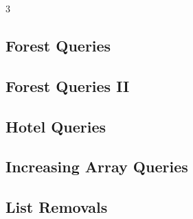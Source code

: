 \documentclass[8pt]{extarticle}
\begin{document}
\begin{multicols*}{3}
\subsection{Forest Queries}
\begin{caixaenunciado}

\end{caixaenunciado}
\vspace{0.3cm}


\subsection{Forest Queries II}
\begin{caixaenunciado}

\end{caixaenunciado}
\vspace{0.3cm}


\subsection{Hotel Queries}
\begin{caixaenunciado}

\end{caixaenunciado}
\vspace{0.3cm}


\subsection{Increasing Array Queries}
\begin{caixaenunciado}

\end{caixaenunciado}
\vspace{0.3cm}


\subsection{List Removals}
\begin{caixaenunciado}

\end{caixaenunciado}
\vspace{0.3cm}



\end{multicols*}
\end{document}
